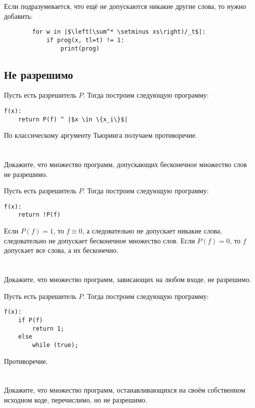 Если подразумевается, что ещё не допускаются никакие другие слова, то нужно добавить:
\begin{verbatim}
        for w in |$\left(\sum^* \setminus xs\right)/_t$|:
            if prog(x, tl=t) != 1:
                print(prog)
\end{verbatim}

\subsection{Не разрешимо}

Пусть есть разрешитель \(P\). Тогда построим следующую программу:
\begin{verbatim}
f(x):
    return P(f) ^ |$x \in \{x_i\}$|
\end{verbatim}

По классическому аргументу Тьюринга получаем противоречие.

\section{}
Докажите, что множество программ, допускающих бесконечное множество слов не разрешимо.

Пусть есть разрешитель \(P\). Тогда построим следующую программу:
\begin{verbatim}
f(x):
    return !P(f)
\end{verbatim}

Если \(P(f) = 1\), то \(f \equiv 0\), а следовательно не допускает никакие слова, следовательно не допускает бесконечное множество слов. Если \(P(f) = 0\), то \(f\) допускает все слова, а их бесконечно.

\section{}
Докажите, что множество программ, зависающих на любом входе, не разрешимо.

Пусть есть разрешитель \(P\). Тогда построим следующую программу:
\begin{verbatim}
f(x):
    if P(f)
        return 1;
    else
        while (true);
\end{verbatim}

Противоречие.

\section{}
Докажите, что множество программ, останавливающихся на своём собственном исходном коде, перечислимо, но не разрешимо.

